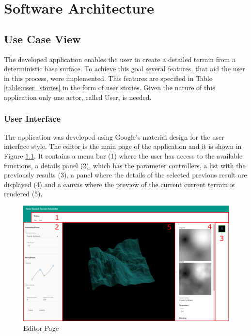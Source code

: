 \chapter{Software Architecture} \label{chap:software_details}

  \section {Use Case View}
    
    The developed application enables the user to create a detailed terrain from a deterministic base surface. To achieve this goal several features, that aid the user in this process, were implemented. This features are specified in Table \ref{table:user_stories} in the form of user stories. Given the nature of this application only one actor, called User, is needed.
    
    
    
    
    \subsection {User Interface}
    
      The application was developed using Google's material design \cite{Google2016} for the user interface style. The editor is the main page of the application and it is shown in Figure \ref{fig:editor_page}. It contains a menu bar (1) where the user has access to the available functions, a details panel (2), which has the parameter controllers, a list with the previously results (3), a panel where the details of the selected previous result are displayed (4) and a canvas where the preview of the current current terrain is rendered (5).
      
      \begin{figure}[H]
      	\centering
      	\includegraphics[width=0.95\linewidth]{images/screenshots/editorWithBoxes.pdf}
      	\caption{Editor Page}
      	\label{fig:editor_page}
      \end{figure}
      
